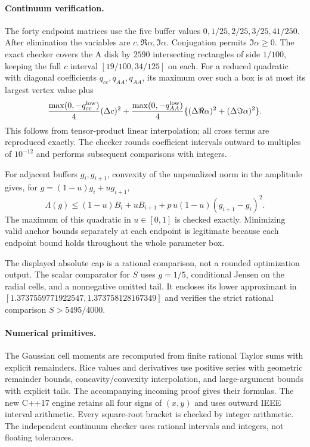 \paragraph{Continuum verification.}
The forty endpoint matrices use the five buffer values
$0,1/25,2/25,3/25,41/250$.
After elimination the variables are $c,\Re\alpha,\Im\alpha$.
Conjugation permits $\Im\alpha\ge0$. The exact checker covers the A disk
by $2590$ intersecting rectangles of side $1/100$, keeping the full
$c$ interval $[19/100,34/125]$ on each.
For a reduced quadratic with diagonal coefficients $q_{cc},q_{AA},q_{AA}$,
its maximum over such a box is at most its largest vertex value plus
\[
 \frac{\max(0,-q_{cc}^{\rm low})}{4}(\Delta c)^2+
 \frac{\max(0,-q_{AA}^{\rm low})}{4}
       \{(\Delta\Re\alpha)^2+(\Delta\Im\alpha)^2\}.
\]
This follows from tensor-product linear interpolation; all cross terms
are reproduced exactly. The checker rounds coefficient intervals
outward to multiples of $10^{-12}$ and performs subsequent comparisons
with integers.

For adjacent buffers $g_i,g_{i+1}$, convexity of the unpenalized norm
in the amplitude gives, for $g=(1-u)g_i+ug_{i+1}$,
\[
 \Lambda(g)\le(1-u)B_i+uB_{i+1}
                 +p\,u(1-u)(g_{i+1}-g_i)^2.
\]
The maximum of this quadratic in $u\in[0,1]$ is checked exactly.
Minimizing valid anchor bounds separately at each endpoint is legitimate
because each endpoint bound holds throughout the whole parameter box.

The displayed absolute cap is a rational comparison, not a rounded
optimization output. The scalar comparator for $S$ uses $g=1/5$,
conditional Jensen on the radial cells, and a nonnegative omitted tail.
It encloses its lower approximant in
$[1.3737559771922547,1.373758128167349]$ and verifies the strict rational
comparison $S>5495/4000$.

\paragraph{Numerical primitives.}
The Gaussian cell moments are recomputed from finite rational Taylor
sums with explicit remainders. Rice values and derivatives use positive
series with geometric remainder bounds, concavity/convexity interpolation,
and large-argument bounds with explicit tails. The accompanying incoming
proof gives their formulas. The new C++17 engine retains all four signs
of $(x,y)$ and uses outward IEEE interval arithmetic. Every square-root
bracket is checked by integer arithmetic. The independent continuum
checker uses rational intervals and integers, not floating tolerances.

